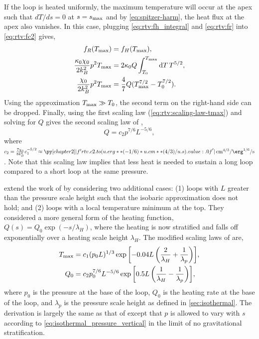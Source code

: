 If the loop is heated uniformly, the maximum temperature will occur at the apex such that $dT/ds=0$ at $s=s_\textup{max}$ and by \autoref{eq:spitzer-harm}, the heat flux at the apex also vanishes. In this case, plugging \autoref{eq:rtv:fh_integral} and \autoref{eq:rtv:fr} into \autoref{eq:rtv:fc2} gives,
\begin{align}
    f_R(T_\textup{max}) &= f_H(T_\textup{max}), \nonumber \\
    \frac{\kappa_0\chi_0}{2k_B^2}p^2T_\textup{max} &= 2\kappa_0Q\int_{T_0}^{T_\textup{max}}\textup{d}T\, T^{5/2}, \nonumber \\
    \frac{\chi_0}{2k_B^2}p^2T_\textup{max} &= \frac{4}{7}Q(T_\textup{max}^{7/2} - T_0^{7/2}).
\end{align}
Using the approximation $T_\textup{max}\gg T_0$, the second term on the right-hand side can be dropped. Finally, using the first scaling law (\autoref{eq:rtv:scaling-law-tmax}) and solving for $Q$ gives the second scaling law of \citet{rosner_dynamics_1978},
\begin{equation}\label{eq:rtv:scaling-law-heat}
    Q = c_2 p^{7/6}L^{-5/6},
\end{equation}
where $c_2=\frac{7\chi_0}{8k_B^2}c_1^{-5/2}\approx\py[chapter2]|f'{rtv.c2.to(u.erg**(-1/6)*u.cm**(4/3)/u.s).value:.0f}'|\,\si{\cm\tothe{4/3}\per\erg\tothe{1/6}\per\second}$. Note that this scaling law implies that less heat is needed to sustain a long loop compared to a short loop at the same pressure.

\citet{serio_dynamics_1991} extend the work of \citet{rosner_dynamics_1978} by considering two additional cases: (1) loops with $L$ greater than the pressure scale height such that the isobaric approximation does not hold; and (2) loops with a local temperature minimum at the top. They considered a more general form of the heating function, $Q(s)=Q_0\exp{(-s/\lambda_H)}$, where the heating is now stratified and falls off exponentially over a heating scale height $\lambda_H$. The modified scaling laws of \citet{serio_dynamics_1991} are,
\begin{align}
    T_\textup{max} &= c_1(p_0L)^{1/3}\exp{\left[-0.04L\left(\frac{2}{\lambda_H} + \frac{1}{\lambda_p}\right)\right]}, \label{eq:serio:scaling-law-tmax} \\
    Q_0 &= c_2p_0^{7/6}L^{-5/6}\exp{\left[0.5L\left(\frac{1}{\lambda_H} - \frac{1}{\lambda_p}\right)\right]}, \label{eq:serio:scaling-law-heat}
\end{align}
where $p_0$ is the pressure at the base of the loop, $Q_0$ is the heating rate at the base of the loop, and $\lambda_p$ is the pressure scale height as defined in \autoref{sec:isothermal}. The derivation is largely the same as that of \citet{rosner_dynamics_1978} except that $p$ is allowed to vary with $s$ according to \autoref{eq:isothermal_pressure_vertical} in the limit of no gravitational stratification. 

